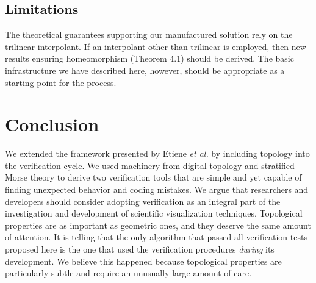 
\subsection{Limitations}
The theoretical guarantees supporting our manufactured solution
rely on the trilinear interpolant.  
If an interpolant other than trilinear is employed, then new results ensuring
homeomorphism (Theorem 4.1) should be derived. 
The basic infrastructure we have described here, however,
should be appropriate as a starting point for the process.


\section{Conclusion}

We extended the framework presented by Etiene \emph{et al.}
\cite{etiene:tvcg:2009} by including topology into the verification
cycle.  We used machinery from digital topology and stratified Morse
theory to derive two verification tools that are simple and yet
capable of finding unexpected behavior and coding mistakes.
%
We argue that researchers and developers should consider adopting
verification as an integral part of the investigation and development
of scientific visualization techniques.  Topological properties are as
important as geometric ones, and they deserve the same amount of
attention. It is telling that the only algorithm that passed all
verification tests proposed here is the one that used
the verification procedures \emph{during} its development. We believe
this happened because topological properties are particularly subtle
and require an unusually large amount of care.



